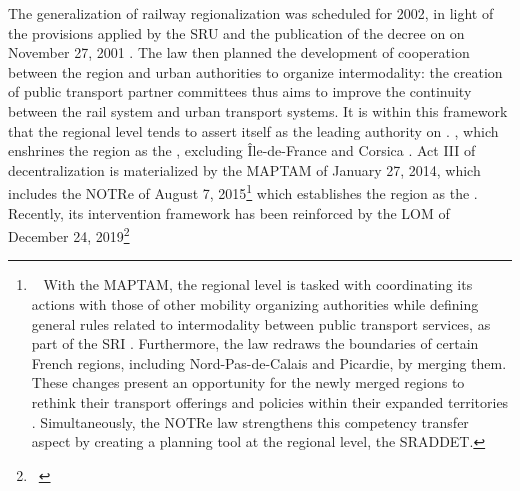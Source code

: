 \begin{refsegment}
{    The generalization of railway regionalization was scheduled for 2002, in light of the provisions applied by the \acrfull{SRU} and the publication of the decree on  on November 27, 2001 \textcolor{blue}{\autocite[132]{burlando_regionalisation_2004}}. The law then planned the development of cooperation between the region and urban authorities to organize intermodality: the creation of public transport partner committees thus aims to improve the continuity between the rail system and urban transport systems. It is within this framework that the regional level tends to assert itself as the leading authority on  \textcolor{blue}{\autocite[I-18]{chauvineau_regionalisation_2001}}.
}, which enshrines the region as the , excluding Île-de-France and Corsica \textcolor{blue}{\autocite{commission_nationale_du_debat_public_chronologie_nodate}}. Act III of decentralization is materialized by the \acrfull{MAPTAM} of January 27, 2014, which includes the \acrfull{NOTRe} of August 7, 2015\footnote{~
    With the \acrfull{MAPTAM}, the regional level is tasked with coordinating its actions with those of other mobility organizing authorities while defining general rules related to intermodality between public transport services, as part of the \acrfull{SRI} \textcolor{blue}{\autocite{gart_aom_nodate}}. Furthermore, the law redraws the boundaries of certain French regions, including Nord-Pas-de-Calais and Picardie, by merging them. These changes present an opportunity for the newly merged regions to rethink their transport offerings and policies within their expanded territories \textcolor{blue}{\autocite{cerema_mobilite_2017}}. Simultaneously, the \acrfull{NOTRe} law strengthens this competency transfer aspect by creating a planning tool at the regional level, the \acrfull{SRADDET}.
} which establishes the region as the  \textcolor{blue}{\autocite{gart_aom_nodate}}. Recently, its intervention framework has been reinforced by the \acrfull{LOM} of December 24, 2019\footnote{~
}
\end{refsegment}
